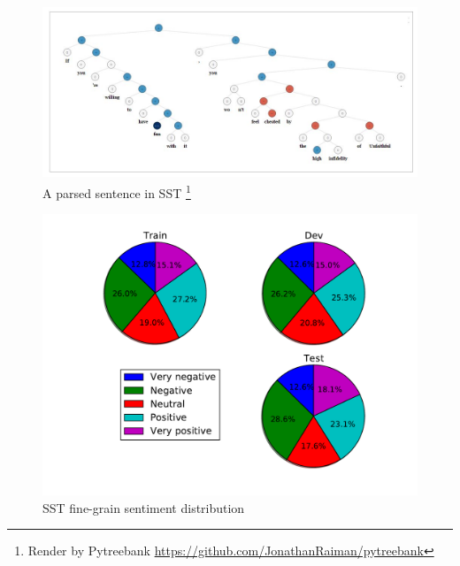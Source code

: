 \begin{figure}[H]
    \begin{minipage}{\textwidth}
        \centering
        \includegraphics[width=0.9\linewidth]{figure/sst}
        \caption[A parsed sentence in SST]{A parsed sentence in SST \footnote{Render by Pytreebank \url{https://github.com/JonathanRaiman/pytreebank}}}
        \label{fig:sst}
    \end{minipage}
\end{figure}

\begin{figure}[H]
    \begin{minipage}{\textwidth}
        \centering
        \includegraphics[width=0.9\linewidth]{figure/sstfinegrain}
        \caption[SST fine-grain sentiment distribution]{SST fine-grain sentiment distribution}
        \label{fig:sstfinegrain}
    \end{minipage}
\end{figure}

